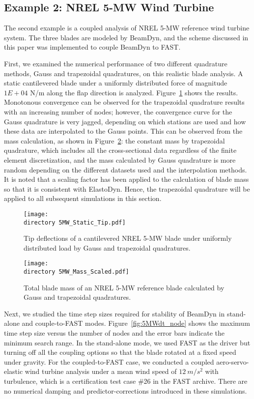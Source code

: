 \documentclass{aiaa-tc}
\def\directory{EPSF/}
\begin{document}
\subsection{Example 2: NREL 5-MW Wind Turbine}
The second example is a coupled analysis of NREL 5-MW reference wind turbine system. The three blades are modeled by BeamDyn, and the scheme discussed in this paper  was implemented to couple BeamDyn to FAST. 

First, we examined the numerical performance of two different quadrature methods, Gauss and trapezoidal quadratures, on this realistic blade analysis. A static cantilevered blade under a uniformly distributed force of magnitude $1E+04$ N/m along the flap direction is analyzed. Figure~\ref{fig:5MWStaticTip} shows the results. Monotonous convergence can be observed for the trapezoidal quadrature results with an increasing number of nodes; however, the convergence curve for the Gauss quadrature is very jagged, depending on which stations are used and how these data are interpolated to the Gauss points. This can be observed from the mass calculation, as shown in Figure~\ref{fig:5MWMass}: the constant mass by trapezoidal quadrature, which includes all the cross-sectional data regardless of the finite element discretization, and the mass calculated by Gauss quadrature is more random depending on the different datasets used and the interpolation methods. It is noted that a scaling factor has been applied to the calculation of blade mass so that it is consistent with ElastoDyn.\cite{report:NREL5MW} Hence, the trapezoidal quadrature will be applied to all subsequent simulations in this section.
\begin{figure}
\centering
\texttt{[image: \\directory 5MW\_Static\_Tip.pdf]}
\caption{Tip deflections of a cantilevered NREL 5-MW blade under uniformly distributed load by Gauss and trapezoidal quadratures.} 
\label{fig:5MWStaticTip}
\end{figure}

\begin{figure}
    \centering
\texttt{[image: \\directory  5MW\_Mass\_Scaled.pdf]}
\caption{Total blade mass of an NREL 5-MW reference blade calculated by Gauss and trapezoidal quadratures.}
\label{fig:5MWMass}
\end{figure} 

Next, we studied the time step sizes required for stability of BeamDyn in stand-alone and couple-to-FAST modes. Figure~\ref{fig:5MWdt_node} shows the maximum time step size versus the number of nodes and the error bars indicate the minimum search range. In the stand-alone mode, we used FAST as the driver but turning off all the coupling options so that the blade rotated at a fixed speed under gravity. For the coupled-to-FAST case, we conducted a coupled aero-servo-elastic wind turbine analysis under a mean wind speed of $12~m/s^2$ with turbulence, which is a certification test case \#26 in the FAST archive. There are no numerical damping and predictor-corrections introduced in these simulations.  
\end{document}
